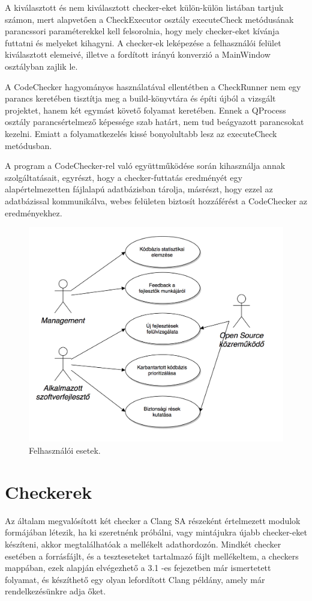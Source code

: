 \documentclass[a4paper,12pt]{report}
\begin{document}
A kiválasztott és nem kiválasztott checker-eket külön-külön listában tartjuk számon, mert alapvetően a CheckExecutor osztály executeCheck metódusának parancssori paraméterekkel kell felsorolnia, hogy mely checker-eket kívánja futtatni és melyeket kihagyni. A checker-ek leképezése a felhasználói felület kiválasztott elemeivé, illetve a fordított irányú konverzió a MainWindow osztályban zajlik le.

A CodeChecker hagyományos használatával ellentétben a CheckRunner nem egy parancs keretében tisztítja meg a build-könyvtára és építi újból a vizsgált projektet, hanem két egymást követő folyamat keretében. Ennek a QProcess osztály parancsértelmező képessége szab határt, nem tud beágyazott parancsokat kezelni. Emiatt a folyamatkezelés kissé bonyolultabb lesz az executeCheck metódusban.

A program a CodeChecker-rel való együttműködése során kihasználja  annak szolgáltatásait, egyrészt, hogy a checker-futtatás eredményét egy alapértelmezetten fájlalapú adatbázisban tárolja, másrészt, hogy ezzel az adatbázissal kommunikálva, webes felületen biztosít hozzáférést a CodeChecker az eredményekhez.

\begin{figure}[h]
\caption{Felhasználói esetek.}
\centering
\includegraphics[scale=0.7]{felhasznaloi.png}
\end{figure}

\section{Checkerek}
Az általam megvalósított két checker a Clang SA részeként értelmezett modulok formájában létezik, ha ki szeretnénk próbálni, vagy mintájukra újabb checker-eket készíteni, akkor megtalálhatóak a mellékelt adathordozón. Mindkét checker esetében a forrásfájlt, és a teszteseteket tartalmazó fájlt mellékeltem, a checkers mappában, ezek alapján elvégezhető a 3.1 -es fejezetben már ismertetett folyamat, és készíthető egy olyan lefordított Clang példány, amely már rendelkezésünkre adja őket.
\end{document}
